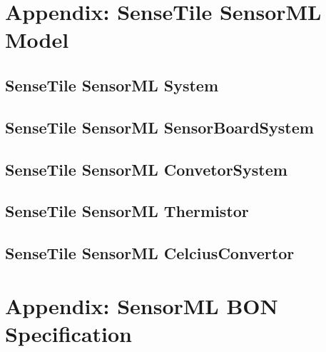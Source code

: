 \documentclass[]{final_report}
\begin{document}
\appendix
\chapter{Appendix: SenseTile SensorML Model}\label{appenA}
\section{SenseTile SensorML System}
\section{SenseTile SensorML SensorBoardSystem}
\section{SenseTile SensorML ConvetorSystem}
\section{SenseTile SensorML Thermistor}

\section{SenseTile SensorML CelciusConvertor}


\chapter{Appendix: SensorML BON Specification}\label{appenB}

\lstset{basicstyle=\scriptsize,showspaces=false,showstringspaces=false}




\label{endpage}
\end{document}

